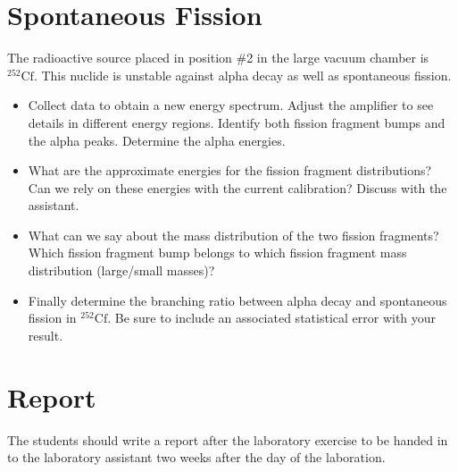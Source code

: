 \documentclass[12pt]{article}
\begin{document}
\section{Spontaneous Fission}
The radioactive source placed in position \#2 in the large
vacuum chamber is $^{252}\mbox{Cf}$. This nuclide is unstable against
alpha decay as well as spontaneous fission.
\begin{itemize}
\item Collect data to obtain a new energy spectrum. Adjust the amplifier 
to see details in different energy regions. Identify both fission
fragment bumps and the alpha peaks. Determine the alpha energies.
\item What are the approximate energies for the fission fragment
  distributions?  Can we rely on these energies with the current
  calibration?  Discuss with the assistant.
\item What can we say about the mass distribution of the two fission
  fragments? Which fission fragment bump belongs to which fission
  fragment mass distribution (large/small masses)?
\item Finally determine the branching ratio between alpha decay and
  spontaneous fission in $^{252}\mbox{Cf}$. Be sure to include an associated 
  statistical error with your result. 
\end{itemize}


\section*{Report}
The students should write a report after the laboratory exercise to be handed
in to the laboratory assistant two weeks after the day of the laboration.




\end{document}
